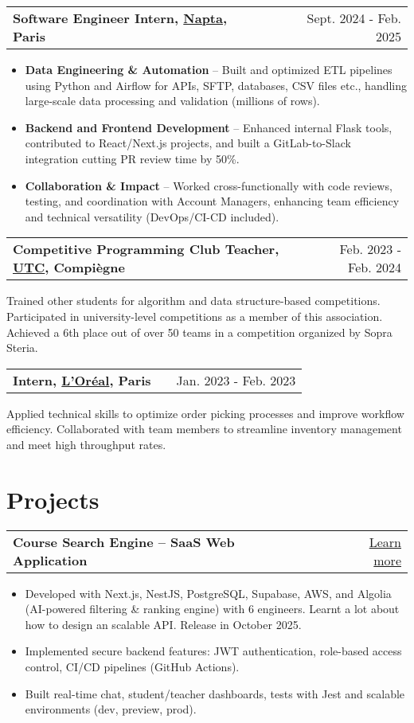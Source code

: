 \documentclass[a4paper,10pt]{article}
\makeatletter
\newenvironment{jobshort}[2]
    {
    \begin{tabularx}{\linewidth}{@{}l X r@{}}
    \textbf{#1} & \hfill &  #2 \\[3.75pt]
    \end{tabularx}
    } {}
\newenvironment{joblong}[2]
    {
    \begin{tabularx}{\linewidth}{@{}l X r@{}}
    \textbf{#1} & \hfill &  #2 \\[3.75pt]
    \end{tabularx}
    \begin{minipage}[t]{\linewidth}
    \begin{itemize}[nosep,after=\strut, leftmargin=1em, itemsep=3pt,label=--]
    }
    {
    \end{itemize}
    \end{minipage}    
    }
\makeatother
\begin{document}
\begin{joblong}{Software Engineer Intern, \href{https://www.napta.io}{Napta}, Paris}{Sept. 2024 - Feb. 2025}
    \item \textbf{Data Engineering \& Automation} – Built and optimized ETL pipelines using Python and Airflow for APIs, SFTP, databases, CSV files etc., handling large-scale data processing and validation (millions of rows).
    \item \textbf{Backend and Frontend Development} – Enhanced internal Flask tools, contributed to React/Next.js projects, and built a GitLab-to-Slack integration cutting PR review time by 50\%.
    \item \textbf{Collaboration \& Impact} – Worked cross-functionally with code reviews, testing, and coordination with Account Managers, enhancing team efficiency and technical versatility (DevOps/CI-CD included).
\end{joblong}

\begin{jobshort}{Competitive Programming Club Teacher, \href{https://www.utc.fr}{UTC}, Compiègne}{Feb. 2023 - Feb. 2024}
    Trained other students for algorithm and data structure-based competitions. Participated in university-level competitions as a member of this association. Achieved a 6th place out of over 50 teams in a competition organized by Sopra Steria.
\end{jobshort}

\begin{jobshort}{Intern, \href{https://www.loreal.com}{L'Oréal}, Paris}{Jan. 2023 - Feb. 2023}
    Applied technical skills to optimize order picking processes and improve workflow efficiency. Collaborated with team members to streamline inventory management and meet high throughput rates.
\end{jobshort}

\section{Projects}

\begin{joblong}{Course Search Engine – SaaS Web Application}{\href{https://mohamedtahiri.com/projects/my-biggest-project}{Learn more}}
    \item Developed with Next.js, NestJS, PostgreSQL, Supabase, AWS, and Algolia (AI-powered filtering \& ranking engine) with 6 engineers. Learnt a lot about how to design an scalable API. Release in October 2025.
    \item Implemented secure backend features: JWT authentication, role-based access control, CI/CD pipelines (GitHub Actions).
    \item Built real-time chat, student/teacher dashboards, tests with Jest and scalable environments (dev, preview, prod).
\end{joblong}
\end{document}

